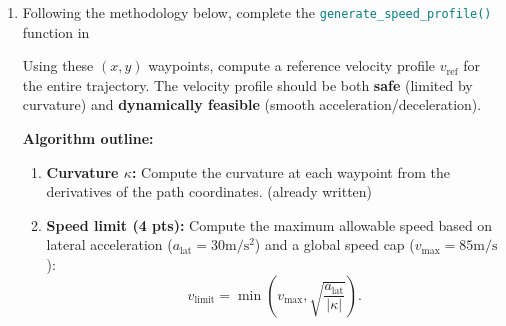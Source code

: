\documentclass[11pt]{article}
\begin{document}
\begin{enumerate}
    \item \textbf{\faPython} Following the methodology below, complete the \textcolor{teal}{\texttt{generate\_speed\_profile()}} function in \textcolor{teal}{\texttt{}}

          Using these $(x, y)$ waypoints, compute a reference velocity profile $v_{\mathrm{ref}}$ for the entire trajectory. The velocity profile should be both \textbf{safe} (limited by curvature) and \textbf{dynamically feasible} (smooth acceleration/deceleration).

          \noindent\textbf{Algorithm outline:}
          \begin{enumerate}
              \item \textbf{Curvature $\kappa$:} Compute the curvature at each waypoint from the derivatives of the path coordinates. (already written)
              \item \textbf{Speed limit (4 pts):} Compute the maximum allowable speed based on lateral acceleration ($a_\mathrm{lat}=30\mathrm{m/s^2}$) and a global speed cap ($v_\mathrm{max}=85\mathrm{m/s}$):
                    \[
                        v_{\mathrm{limit}} = \min\left(v_{\max}, \sqrt{\frac{a_{\mathrm{lat}}}{\lvert\kappa\rvert}}\right).
                    \]
                    

\end{enumerate}
\end{enumerate}
\end{document}
